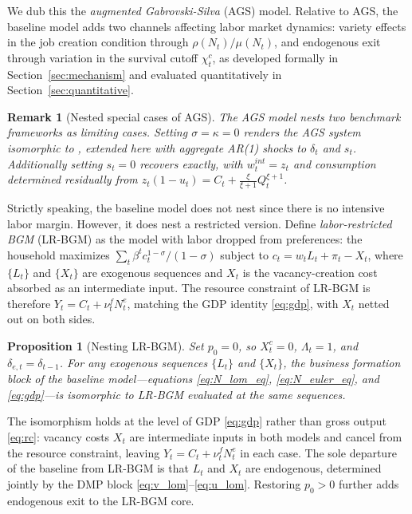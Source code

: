 \documentclass[authoryear, review, 12pt]{elsarticle}
\newtheorem{proposition}{Proposition}
\newtheorem{remark}{Remark}
\begin{document}
We dub this the \emph{augmented Gabrovski-Silva} 
(AGS) model. Relative to AGS, the baseline model 
adds two channels affecting labor market dynamics: 
variety effects in the job creation condition 
through $\rho(N_t)/\mu(N_t)$, and endogenous exit 
through variation in the survival cutoff $\chi_t^c$, 
as developed formally in Section~\ref{sec:mechanism} 
and evaluated quantitatively in 
Section~\ref{sec:quantitative}.

\begin{remark}[Nested special cases of AGS]
	\label{rem:nesting}
	The AGS model nests two benchmark frameworks as
	limiting cases. Setting $\sigma=\kappa=0$ renders
	the AGS system isomorphic to \citet{gabrovski_2025},
	extended here with aggregate AR(1) shocks to
	$\delta_t$ and $s_t$.
	Additionally setting $s_t=0$ recovers
	\citet{coles_2018} exactly, with $w_t^{int}=z_t$
	and consumption determined residually from
	$z_t(1-u_t)=C_t+\frac{\xi}{\xi+1}Q_t^{\xi+1}$.
\end{remark}

Strictly speaking, the baseline model does not nest
\citet{bilbiie_2012} since there is no intensive labor
margin.  However, it does nest a restricted version.
Define \emph{labor-restricted BGM} (LR-BGM) as the
\citet{bilbiie_2012} model with labor dropped from
preferences: the household maximizes $\sum_t \beta^t
c_t^{1-\sigma}/(1-\sigma)$ subject to
$c_t = w_t L_t + \pi_t - X_t$, where $\{L_t\}$ and
$\{X_t\}$ are exogenous sequences and $X_t$ is the
vacancy-creation cost absorbed as an intermediate input.
The resource constraint of LR-BGM is therefore
$Y_t = C_t + \nu_t^f N_t^e$, matching the GDP identity
\eqref{eq:gdp}, with $X_t$ netted out on both sides.

\begin{proposition}[Nesting LR-BGM]
	\label{prop:bgm_nest}
	Set $p_0=0$, so $X_t^c=0$, $\Lambda_t=1$, and
	$\delta_{e,t}=\delta_{t-1}$.  For any exogenous
	sequences $\{L_t\}$ and $\{X_t\}$, the business
	formation block of the baseline model---equations
	\eqref{eq:N_lom_eq}, \eqref{eq:N_euler_eq}, and
	\eqref{eq:gdp}---is isomorphic to LR-BGM evaluated
	at the same sequences.
\end{proposition}

The isomorphism holds at the level of GDP \eqref{eq:gdp}
rather than gross output \eqref{eq:rc}: vacancy costs
$X_t$ are intermediate inputs in both models and cancel
from the resource constraint, leaving
$Y_t = C_t + \nu_t^f N_t^e$ in each case.  The sole
departure of the baseline from LR-BGM is that $L_t$ and
$X_t$ are endogenous, determined jointly by the DMP block
\eqref{eq:v_lom}--\eqref{eq:u_lom}.  Restoring $p_0>0$
further adds endogenous exit to the LR-BGM core.
\end{document}
